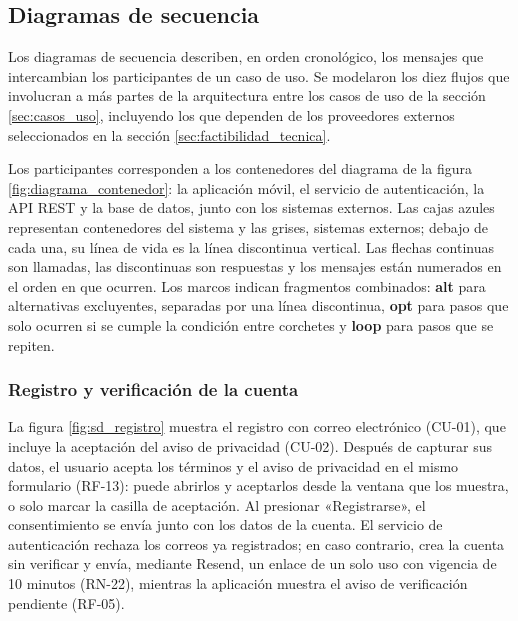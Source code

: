 
\subsection{Diagramas de secuencia}

Los diagramas de secuencia describen, en orden cronológico, los mensajes que intercambian los participantes de un caso de uso. Se modelaron los diez flujos que involucran a más partes de la arquitectura entre los casos de uso de la sección \ref{sec:casos_uso}, incluyendo los que dependen de los proveedores externos seleccionados en la sección \ref{sec:factibilidad_tecnica}.

Los participantes corresponden a los contenedores del diagrama de la figura \ref{fig:diagrama_contenedor}: la aplicación móvil, el servicio de autenticación, la API REST y la base de datos, junto con los sistemas externos. Las cajas azules representan contenedores del sistema y las grises, sistemas externos; debajo de cada una, su línea de vida es la línea discontinua vertical. Las flechas continuas son llamadas, las discontinuas son respuestas y los mensajes están numerados en el orden en que ocurren. Los marcos indican fragmentos combinados: \textbf{alt} para alternativas excluyentes, separadas por una línea discontinua, \textbf{opt} para pasos que solo ocurren si se cumple la condición entre corchetes y \textbf{loop} para pasos que se repiten.


\subsubsection{Registro y verificación de la cuenta}

La figura \ref{fig:sd_registro} muestra el registro con correo electrónico (CU-01), que incluye la aceptación del aviso de privacidad (CU-02). Después de capturar sus datos, el usuario acepta los términos y el aviso de privacidad en el mismo formulario (RF-13): puede abrirlos y aceptarlos desde la ventana que los muestra, o solo marcar la casilla de aceptación. Al presionar «Registrarse», el consentimiento se envía junto con los datos de la cuenta. El servicio de autenticación rechaza los correos ya registrados; en caso contrario, crea la cuenta sin verificar y envía, mediante Resend, un enlace de un solo uso con vigencia de 10 minutos (RN-22), mientras la aplicación muestra el aviso de verificación pendiente (RF-05).

